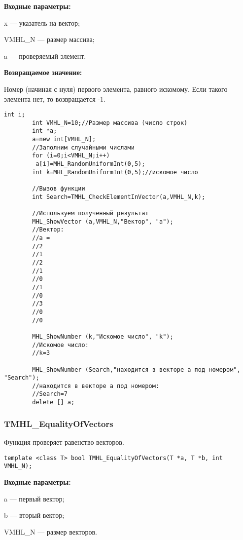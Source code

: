 \documentclass[a4paper,12pt]{article}
\begin{document}
\textbf{Входные параметры:}

   x --- указатель на вектор;
   
 VMHL\_N --- размер массива;
 
 a --- проверяемый элемент.

\textbf{Возвращаемое значение:}

 Номер (начиная с нуля) первого элемента, равного искомому. Если такого элемента нет, то возвращается -1.


\begin{lstlisting}[label=code_use_TMHL_CheckElementInVector,caption=Пример использования]
        int i;
        int VMHL_N=10;//Размер массива (число строк)
        int *a;
        a=new int[VMHL_N];
        //Заполним случайными числами
        for (i=0;i<VMHL_N;i++)
         a[i]=MHL_RandomUniformInt(0,5);
        int k=MHL_RandomUniformInt(0,5);//искомое число

        //Вызов функции
        int Search=TMHL_CheckElementInVector(a,VMHL_N,k);

        //Используем полученный результат
        MHL_ShowVector (a,VMHL_N,"Вектор", "a");
        //Вектор:
        //a =
        //2
        //1
        //2
        //1
        //0
        //1
        //0
        //3
        //0
        //0

        MHL_ShowNumber (k,"Искомое число", "k");
        //Искомое число:
        //k=3

        MHL_ShowNumber (Search,"находится в векторе a под номером", "Search");
        //находится в векторе a под номером:
        //Search=7
        delete [] a;
\end{lstlisting}

\subsubsection{TMHL\_EqualityOfVectors}\label{TMHL_EqualityOfVectors}

Функция проверяет равенство векторов.


\begin{lstlisting}[label=code_syntax_TMHL_EqualityOfVectors,caption=Синтаксис]
template <class T> bool TMHL_EqualityOfVectors(T *a, T *b, int VMHL_N);
\end{lstlisting}

\textbf{Входные параметры:}

  a --- первый вектор;
  
 b --- вторый вектор;
 
 VMHL\_N --- размер векторов.
\end{document}
